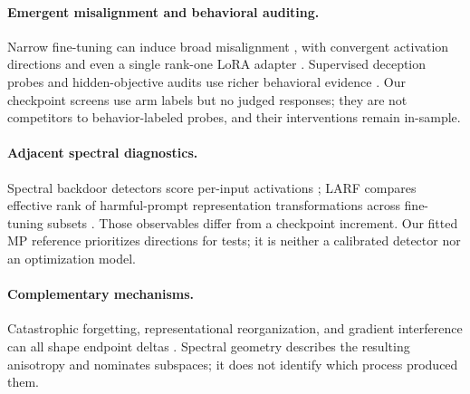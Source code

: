 \paragraph{Emergent misalignment and behavioral auditing.}
Narrow fine-tuning can induce broad misalignment \citep{betley2025emergent},
with convergent activation directions \citep{soligo2025convergent} and even a
single rank-one LoRA adapter \citep{turner2025organisms}. Supervised deception
probes and hidden-objective audits use richer behavioral evidence
\citep{goldowskydill2025,marks2025}. Our checkpoint screens use arm labels but
no judged responses; they are not competitors to behavior-labeled probes, and
their interventions remain in-sample.

\paragraph{Adjacent spectral diagnostics.}
Spectral backdoor detectors score per-input activations \citep{tran2018spectral};
LARF compares effective rank of harmful-prompt representation transformations
across fine-tuning subsets \citep{larf2025}. Those observables differ from a
checkpoint increment. Our fitted MP reference prioritizes directions for tests;
it is neither a calibrated detector nor an optimization model.

\paragraph{Complementary mechanisms.}
Catastrophic forgetting, representational reorganization, and gradient
interference can all shape endpoint deltas
\citep{kirkpatrick2017,merchant2020,yu2020gradient}. Spectral geometry describes
the resulting anisotropy and nominates subspaces; it does not identify which
process produced them.
